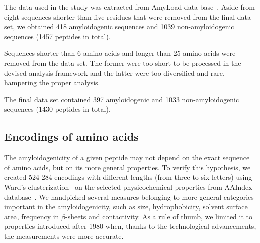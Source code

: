 \documentclass[a4,center,fleqn]{NAR}
\begin{document}
The data used in the study was extracted from AmyLoad data 
base~\citep{wozniak_amyload:_2015}. Aside from eight sequences shorter than five 
residues that were removed from the final data set, we obtained 418 
amyloidogenic sequences and 1039 non-amyloidogenic sequences (1457 peptides in 
total).

  Sequences shorter than 6 amino acids and longer than 25 amino acids were 
removed from the data set. The former were too short to be processed in the 
%
%
%
devised analysis framework and the latter were too diversified and rare, 
hampering the proper analysis.

  The final data set contained 397 amyloidogenic and 1033 non-amyloidogenic 
sequences (1430 peptides in total). 

\subsection{Encodings of amino acids}

The amyloidogenicity of a given peptide may not depend on the exact sequence of 
amino acids, but on its more general properties. To verify this hypothesis, we 
 created 524 284 encodings with different lengths 
%
%
(from three to six letters) using Ward's 
clusterization~\citep{joe_h._ward_jr_hierarchical_1963} on the selected physicochemical 
properties from AAIndex database~\citep{kawashima_aaindex:_2008}. We handpicked 
several measures belonging to more general categories important in the  
amyloidogenicity, such as size, hydrophobicity, solvent surface area, frequency 
in $\beta$-sheets and contactivity. As a rule of thumb, we limited it to 
properties introduced after 1980 when, thanks to the technological advancements, 
the measurements were more accurate.
\end{document}
